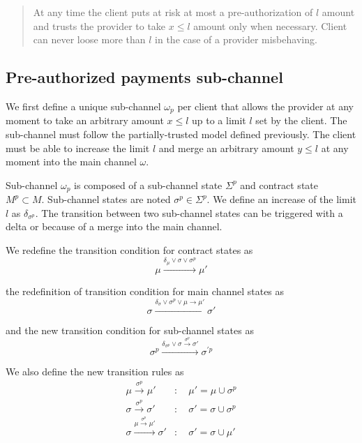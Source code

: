 \documentclass{llncs}
\begin{document}
\begin{quote}
    At any time the client puts at risk at most a pre-authorization of $l$ amount and trusts the provider to take $x \leq l$ amount only when necessary. Client can never loose more than $l$ in the case of a provider misbehaving.
\end{quote}

\subsection{Pre-authorized payments sub-channel} We first define a unique sub-channel $\omega_p$ per client that allows the provider at any moment to take an arbitrary amount $x \leq l$ up to a limit $l$ set by the client. The sub-channel must follow the partially-trusted model defined previously. The client must be able to increase the limit $l$ and merge an arbitrary amount $y \leq l$ at any moment into the main channel $\omega$.


Sub-channel $\omega_p$ is composed of a sub-channel state $\Sigma^p$ and contract state $M^p \subset M$. Sub-channel states are noted $\sigma^p \in \Sigma^p$. We define an increase of the limit $l$ as $\delta_{\sigma^p}$. The transition between two sub-channel states can be triggered with a delta or because of a merge into the main channel.

We redefine the transition condition for contract states as
$$\mu \xrightarrow{\delta_\mu \lor \sigma \lor \sigma^p} \mu'$$

the redefinition of transition condition for main channel states as
$$\sigma \xrightarrow{\delta_\sigma \lor \sigma^p \lor \mu \rightarrow \mu'} \sigma'$$

and the new transition condition for sub-channel states as
$$\sigma^p \xrightarrow{\delta_{\sigma^p} \lor \sigma \xrightarrow{\sigma^p} \sigma'} \sigma^{\prime p}$$

We also define the new transition rules as
\begin{equation*}
\begin{split}
    \mu \xrightarrow{\sigma^p} \mu' &: \quad \mu' = \mu \cup \sigma^p \\
    \sigma \xrightarrow{\sigma^p} \sigma' &: \quad \sigma' = \sigma \cup \sigma^p \\
    \sigma \xrightarrow{\mu \xrightarrow{\sigma^p} \mu'} \sigma' &: \quad \sigma' = \sigma \cup \mu' \\
\end{split}
\end{equation*}
\end{document}
